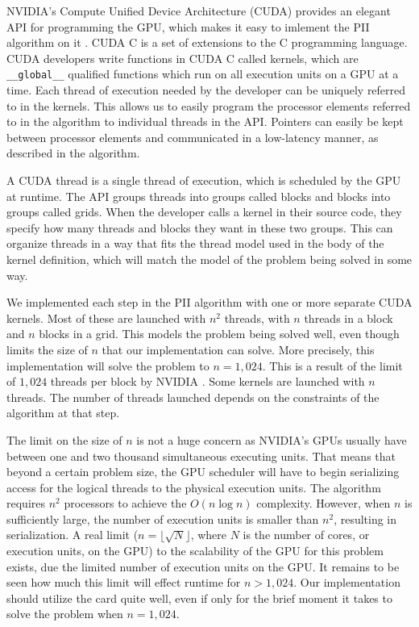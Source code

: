 \documentclass[journal]{IEEEtran}
\begin{document}
NVIDIA's Compute Unified Device Architecture (CUDA) provides an elegant API for
programming the GPU, which makes it easy to imlement the PII algorithm on it
\cite{nvidia}.  CUDA C is a set of extensions to the C programming language.
CUDA developers write functions in CUDA C called kernels, which are
\texttt{\_\_global\_\_} qualified functions which run on all execution units on
a GPU at a time.  Each thread of execution needed by the developer can be
uniquely referred to in the kernels.  This allows us to easily program the
processor elements referred to in the algorithm to individual threads in the
API.  Pointers can easily be kept between processor elements and communicated
in a low-latency manner, as described in the algorithm.

A CUDA thread is a single thread of execution, which is scheduled by the GPU at
runtime.  The API groups threads into groups called blocks and blocks into
groups called grids.  When the developer calls a kernel in their source code,
they specify how many threads and blocks they want in these two groups.  This
can organize threads in a way that fits the thread model used in the body of
the kernel definition, which will match the model of the problem being solved
in some way.

We implemented each step in the PII algorithm with one or more separate CUDA
kernels.  Most of these are launched with $n^2$ threads, with $n$ threads in a
block and $n$ blocks in a grid.  This models the problem being solved well,
even though limits the size of $n$ that our implementation can solve.  More
precisely, this implementation will solve the problem to $n=1,024$.  This is a
result of the limit of $1,024$ threads per block by NVIDIA \cite{nvidia}.  Some
kernels are launched with $n$ threads.  The number of threads launched depends
on the constraints of the algorithm at that step.

The limit on the size of $n$ is not a huge concern as NVIDIA's GPUs usually
have between one and two thousand simultaneous executing units.  That means
that beyond a certain problem size, the GPU scheduler will have to begin
serializing access for the logical threads to the physical execution units.
The algorithm requires $n^2$ processors to achieve the $O(n \log n)$
complexity.  However, when $n$ is sufficiently large, the number of execution
units is smaller than $n^2$, resulting in serialization.  A real limit
($n=\lfloor{\sqrt{N}}\rfloor$, where $N$ is the number of cores, or execution
units, on the GPU) to the scalability of the GPU for this problem exists, due
the limited number of execution units on the GPU.  It remains to be seen how
much this limit will effect runtime for $n>1,024$.  Our implementation should
utilize the card quite well, even if only for the brief moment it takes to
solve the problem when $n = 1,024$.
\end{document}
